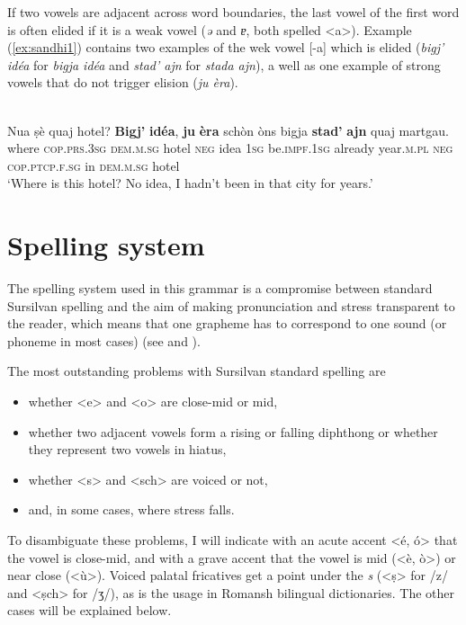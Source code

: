 If two vowels are adjacent across word boundaries, the last vowel of the first word is often elided if it is a weak vowel (\textit{ə} and \textit{ɐ}, both spelled <a>). Example (\ref{ex:sandhi1}) contains two examples of the wek vowel [-a] which is elided (\textit{bigj' idéa} for \textit{bigja idéa} and \textit{stad' ajn} for \textit{stada ajn}), a well as one example of strong vowels that do not trigger elision (\textit{ju èra}).



\ea
\label{ex:sandhi1}
\\
\gll Nua ṣè quaj hotel? \textbf{Bigj'} \textbf{idéa}, \textbf{ju} \textbf{èra} schòn òns bigja \textbf{stad’} \textbf{ajn} quaj martgau.   \\
where \textsc{cop.prs.3sg} \textsc{dem.m.sg} hotel \textsc{neg} idea \textsc{1sg} be.\textsc{impf.1sg} already year.\textsc{m.pl} \textsc{neg} \textsc{cop.ptcp.f.sg} in \textsc{dem.m.sg} hotel\\
\glt `Where is this hotel? No idea, I hadn't been in that city for years.'
\z

\section{Spelling system}

The spelling system used in this grammar is a compromise between standard Sursilvan spelling and the aim of making pronunciation and stress transparent to the reader, which means that one grapheme has to correspond to one sound (or phoneme in most cases) (see  and ). 

The most outstanding problems with Sursilvan standard spelling are

\begin{itemize}
\item whether <e> and <o> are close-mid or mid, 
\item whether two adjacent vowels form a rising or falling diphthong or whether they represent two vowels in hiatus,
\item whether <s> and <sch> are voiced or not, 
\item and, in some cases, where stress falls.
\end{itemize}
 
To disambiguate these problems, I will indicate with an acute accent <é, ó> that the vowel is close-mid, and with a grave accent that the vowel is mid (<è, ò>) or near close (<ù>). Voiced palatal fricatives get a point under the \textit{s} (<ṣ> for /z/ and <ṣch> for /ʒ/), as is the usage in Romansh bilingual dictionaries. The other cases will be explained below.

